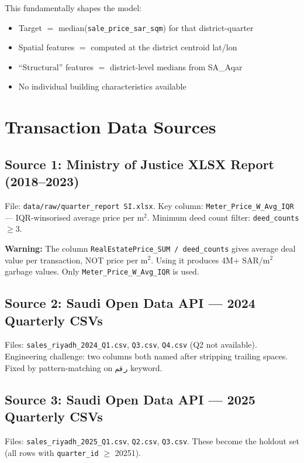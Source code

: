 \documentclass[11pt, a4paper, twoside]{report}
\begin{document}
This fundamentally shapes the model:
\begin{itemize}
  \item Target $=$ median(\texttt{sale\_price\_sar\_sqm}) for that district-quarter
  \item Spatial features $=$ computed at the district centroid lat/lon
  \item ``Structural'' features $=$ district-level medians from SA\_Aqar
  \item No individual building characteristics available
\end{itemize}

\section{Transaction Data Sources}

\subsection*{Source 1: Ministry of Justice XLSX Report (2018--2023)}
File: \texttt{data/raw/quarter\_report SI.xlsx}.
Key column: \texttt{Meter\_Price\_W\_Avg\_IQR} --- IQR-winsorised average
price per m$^2$. Minimum deed count filter: \texttt{deed\_counts} $\geq 3$.
\begin{tcolorbox}[colback=red!5,colframe=red!60]
  \textbf{Warning:} The column \texttt{RealEstatePrice\_SUM / deed\_counts}
  gives average deal value per transaction, NOT price per m$^2$. Using it
  produces 4M+ SAR/m$^2$ garbage values. Only
  \texttt{Meter\_Price\_W\_Avg\_IQR} is used.
\end{tcolorbox}

\subsection*{Source 2: Saudi Open Data API --- 2024 Quarterly CSVs}
Files: \texttt{sales\_riyadh\_2024\_Q1.csv}, \texttt{Q3.csv}, \texttt{Q4.csv}
(Q2 not available). Engineering challenge: two columns both named
\texttt{} after stripping trailing spaces. Fixed by
pattern-matching on \texttt{رقم} keyword.

\subsection*{Source 3: Saudi Open Data API --- 2025 Quarterly CSVs}
Files: \texttt{sales\_riyadh\_2025\_Q1.csv}, \texttt{Q2.csv}, \texttt{Q3.csv}.
These become the holdout set (all rows with \texttt{quarter\_id} $\geq$ 20251).
\end{document}
